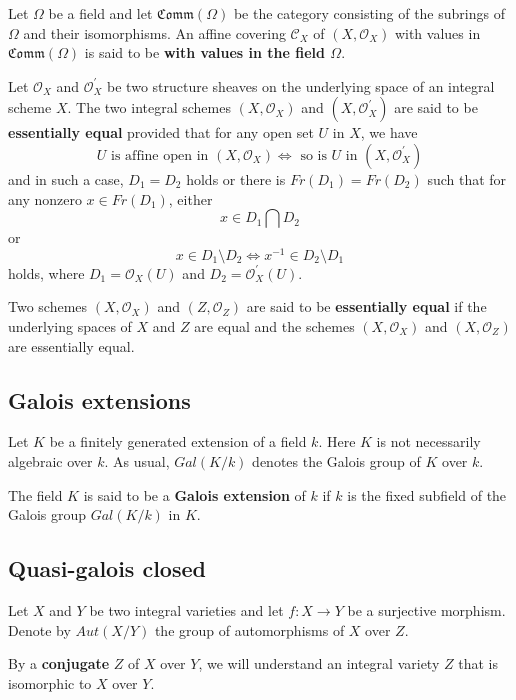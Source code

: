 \documentclass[12pt,twoside,reqno]{amsart}
\theoremstyle{definition}
\numberwithin{equation}{section}
\begin{document}
Let $\Omega $ be a field and let $\mathfrak{Comm}(\Omega )$ be the category
consisting of the subrings of $\Omega $ and their isomorphisms. An affine
covering $\mathcal{C}_{X}$ of $(X,\mathcal{O}_{X})$ with values in $\mathfrak{Comm}(\Omega )$ is said to be \textbf{with values in the field $\Omega $}.

Let $\mathcal{O}_{X}$ and $\mathcal{O}^{\prime}_{X}$ be two structure sheaves on the underlying space of an integral scheme $X$. The two integral schemes $(X,\mathcal{O}_{X})$ and $(X, \mathcal{O}^{\prime}_{X})$ are said to be \textbf{essentially equal} provided that for any open set $U$ in $X$, we have
 $$U \text{ is affine open in }(X,\mathcal{O}_{X}) \Longleftrightarrow \text{ so is }U \text{ in }(X,\mathcal{O}^{\prime}_{X})$$ and in such a case,  $D_{1}=D_{2}$ holds or  there is $Fr(D_{1})=Fr(D_{2})$ such that for any nonzero $x\in Fr(D_{1})$, either $$x\in D_{1}\bigcap D_{2}$$ or $$x\in D_{1}\setminus D_{2} \Longleftrightarrow x^{-1}\in D_{2}\setminus D_{1}$$ holds, where $D_{1}=\mathcal{O}_{X} (U)$ and $D_{2}=\mathcal{O}^{\prime}_{X} (U)$.


 Two schemes $(X,\mathcal{O}_{X})$ and $(Z,\mathcal{O}_{Z})$ are said to be \textbf{essentially equal} if the underlying spaces of $X$ and $Z$ are equal and the schemes $(X,\mathcal{O}_{X})$ and $(X,\mathcal{O}_{Z})$ are essentially equal.

\subsection{Galois extensions}

Let $K$ be a finitely generated extension of a field $k$. Here $K$ is not
necessarily algebraic over $k$. As usual, $Gal\left( K/k\right) $ denotes
the Galois group of $K$ over $k$.

The field $K$ is said to be a \textbf{Galois extension} of $k$ if $k$ is the
fixed subfield of the Galois group $Gal\left( K/k\right) $ in $K$.

\subsection{Quasi-galois closed}

Let $X$ and $Y$ be two integral varieties and let $f:X\rightarrow Y$ be a
surjective morphism. Denote by $Aut\left( X/Y\right) $ the group of
automorphisms of $X$ over $Z$.

By a \textbf{conjugate} $Z$ of $X$ over $Y$, we will understand an integral
variety $Z$ that is isomorphic to $X$ over $Y$.
\end{document}
